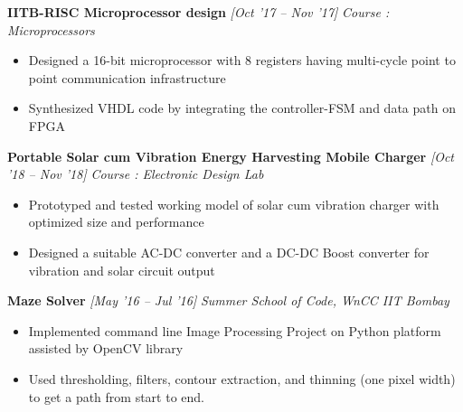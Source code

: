 \documentclass[10 pt]{article}%
\begin{document}
{{{{{%
{\flushleft \textbf {\large{IITB-RISC Microprocessor design}} \hfill {{{\em{[Oct '17 – Nov '17]}}}}
	\vspace{-0.8em}
	{\flushleft \em{Course : Microprocessors}}
	\vspace{-5pt}
	\begin{itemize}[leftmargin=*]
		\setlength\itemsep{1.5pt}
\setlength\parskip{1.5pt}
		\item Designed a 16-bit microprocessor with 8 registers having multi-cycle point to point communication infrastructure
		\item Synthesized VHDL code by integrating the controller-FSM and data path on FPGA
	\end{itemize}
{\flushleft \textbf {\large{Portable Solar cum Vibration Energy Harvesting Mobile Charger}} \hfill {{{\em{[Oct '18 – Nov '18]}}}}
	\vspace{-0.8em}
	{\flushleft \em{Course : Electronic Design Lab}}
	\vspace{-5pt}
	\begin{itemize}[leftmargin=*]
		\setlength\itemsep{1.5pt}
		\setlength\parskip{1.5pt}
			\item Prototyped and tested working model of solar cum vibration charger with optimized size and performance
			\item Designed a suitable AC-DC converter and a DC-DC Boost converter for vibration and solar circuit output
	\end{itemize}
{\flushleft \textbf {\large{Maze Solver}} \hfill {{{\em{[May '16 – Jul '16]}}}}
	\vspace{-0.8em}
	{\flushleft \em{Summer School of Code, WnCC IIT Bombay}}
	\vspace{-5pt}
	\begin{itemize}[leftmargin=*]
		\setlength\itemsep{1.5pt}
		\setlength\parskip{1.5pt}
		\item Implemented command line Image Processing Project on Python platform assisted by OpenCV library
		\item Used thresholding, filters, contour extraction, and thinning (one pixel width) to get a path from start to end.
	\end{itemize}

}}}}}}}}
\end{document}
